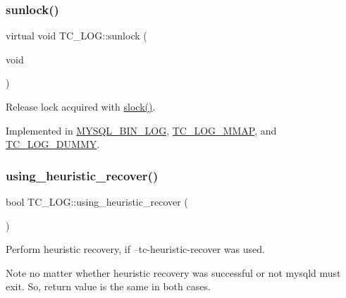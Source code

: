 \mbox{\label{classTC__LOG_ab383cdb4b722c9b11d284ac8b970b087}} 
\subsubsection{\texorpdfstring{sunlock()}{sunlock()}}
{\footnotesize\ttfamily virtual void T\+C\+\_\+\+L\+O\+G\+::sunlock (\begin{DoxyParamCaption}\item[{void}]{ }\end{DoxyParamCaption})\hspace{0.3cm}{\ttfamily [pure virtual]}}

Release lock acquired with \mbox{\hyperlink{classTC__LOG_a5b73af1ad12c691b3417c565f7e58a1c}{slock()}}. 

Implemented in \mbox{\hyperlink{classMYSQL__BIN__LOG_a594f819067f89619e7329f67043c1323}{M\+Y\+S\+Q\+L\+\_\+\+B\+I\+N\+\_\+\+L\+OG}}, \mbox{\hyperlink{classTC__LOG__MMAP_a8f2d68fb0873cc813dcfc65d4d922261}{T\+C\+\_\+\+L\+O\+G\+\_\+\+M\+M\+AP}}, and \mbox{\hyperlink{classTC__LOG__DUMMY_a5ab2da6fa3688756cf9694d25db67c6c}{T\+C\+\_\+\+L\+O\+G\+\_\+\+D\+U\+M\+MY}}.

\mbox{\label{classTC__LOG_a57d3ed9dfb015fb2427a25eecaf78687}} 
\subsubsection{\texorpdfstring{using\+\_\+heuristic\+\_\+recover()}{using\_heuristic\_recover()}}
{\footnotesize\ttfamily bool T\+C\+\_\+\+L\+O\+G\+::using\+\_\+heuristic\+\_\+recover (\begin{DoxyParamCaption}{ }\end{DoxyParamCaption})}

Perform heuristic recovery, if --tc-\/heuristic-\/recover was used.

\begin{DoxyNote}{Note}
no matter whether heuristic recovery was successful or not mysqld must exit. So, return value is the same in both cases.
\end{DoxyNote}

